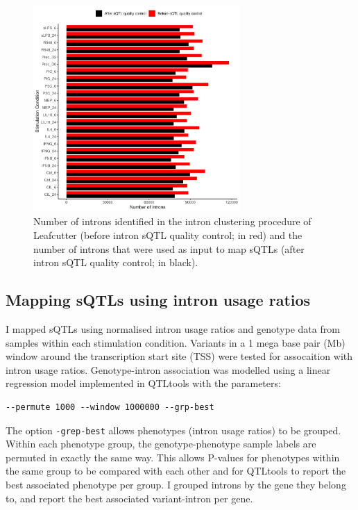 \begin{figure}[H]
  \centering
  \includegraphics[width=0.7\textwidth]{qc_introns_num}
  \caption{Number of introns identified in the intron clustering procedure of
  Leafcutter (before intron sQTL quality control; in red) and the number of introns that were
  used as input to map sQTLs (after intron sQTL quality control; in black).}
  \label{fig:qc_introns_num}   
\end{figure}

\subsection{Mapping sQTLs using intron usage ratios}
I mapped sQTLs using normalised intron usage ratios and genotype data from samples within each stimulation condition. Variants in a 1 mega base pair (Mb) window around the transcription start site (TSS) were tested for assocaition with intron usage ratios. Genotype-intron association was modelled using a linear regression model implemented in QTLtools \cite{Delaneau2017-dg} with the parameters:
\begin{verbatim}
--permute 1000 --window 1000000 --grp-best
\end{verbatim}
The option \Verb+-grep-best+ allows phenotypes (intron usage ratios) to be grouped. Within each phenotype group, the genotype-phenotype sample labels are permuted in exactly the same way. This allows P-values for phenotypes within the same group to be compared with each other and for QTLtools to report the best associated phenotype per group. I grouped introns by the gene they belong to, and report the best associated variant-intron per gene.

